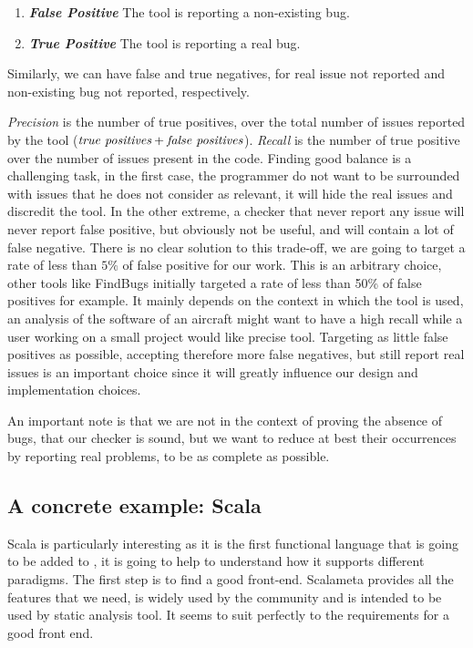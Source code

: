 \begin{enumerate}
	\item \textbf{\textit{False Positive}} \newline The tool is reporting a non-existing bug.
	\item \textbf{\textit{True Positive}} \newline The tool is reporting a real bug. 
\end{enumerate}
Similarly, we can have false and true negatives, for real issue not reported and non-existing bug not reported, respectively. 

\emph{Precision} is the number of true positives, over the total number of issues reported by the tool ($ \emph{true positives} + \emph{false positives} $). \emph{Recall} is the number of true positive over the number of issues present in the code. 
Finding good balance is a challenging task, in the first case, the programmer do not want to be surrounded with issues that he does not consider as relevant, it will hide the real issues and discredit the tool. 
In the other extreme, a checker that never report any issue will never report false positive, but obviously not be useful, and will contain a lot of false negative. 
There is no clear solution to this trade-off, we are going to target a rate of less than $5\%$ of false positive for our work.
This is an arbitrary choice, other tools like FindBugs \cite{Hovemeyer:2004:FBE:1052883.1052895} initially targeted a rate of less than 50\% of false positives for example. 
It mainly depends on the context in which the tool is used, an analysis of the software of an aircraft might want to have a high recall while a user working on a small project would like precise tool. 
Targeting as little false positives as possible, accepting therefore more false negatives, but still report real issues is an important choice since it will greatly influence our design and implementation choices.

An important note is that we are not in the context of proving the absence of bugs, that our checker is sound, but we want to reduce at best their occurrences by reporting real problems, to be as complete as possible.

\subsection{A concrete example: Scala}
\label{subsec:concrete_example}

Scala is particularly interesting as it is the first functional language that is going to be added to \slang{}, it is going to help to understand how it supports different paradigms.
The first step is to find a good front-end.
Scalameta \cite{Scalameta:2019:Online} provides all the features that we need, is widely used by the community and is intended to be used by static analysis tool. 
It seems to suit perfectly to the requirements for a good front end.


